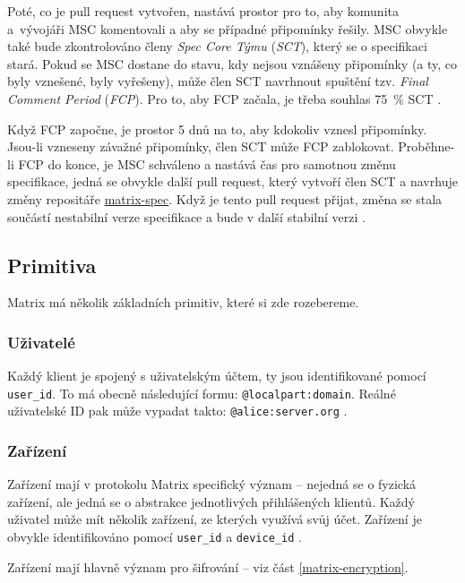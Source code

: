 Poté, co je pull request vytvořen, nastává prostor pro to, aby komunita
a~vývojáři MSC komentovali a aby se případné připomínky řešily. MSC obvykle také
bude zkontrolováno členy \textit{Spec Core Týmu} (\textit{SCT}), který se o
specifikaci stará. Pokud se MSC dostane do stavu, kdy nejsou vznášeny připomínky
(a ty, co byly vznešené, byly vyřešeny), může člen SCT navrhnout spuštění tzv.
\textit{Final Comment Period} (\textit{FCP}). Pro to, aby FCP začala, je třeba
souhlas 75~\% SCT \cite{MatrixORG-MSCs}.

Když FCP započne, je prostor 5 dnů na to, aby kdokoliv vznesl připomínky.
Jsou-li vzneseny závažné připomínky, člen SCT může FCP zablokovat. Proběhne-li
FCP do konce, je MSC schváleno a nastává čas pro samotnou změnu specifikace,
jedná se obvykle další pull request, který vytvoří člen SCT a navrhuje změny
repositáře \href{https://github.com/matrix-org/matrix-spec}{matrix-spec}. Když
je tento pull request přijat, změna se stala součástí nestabilní verze
specifikace a bude v další stabilní verzi \cite{MatrixORG-MSCs}.

\subsection{Primitiva}

Matrix má několik základních primitiv, které si zde rozebereme.

\subsubsection{Uživatelé}

Každý klient je spojený s uživatelským účtem, ty jsou identifikované pomocí
\texttt{user_id}. To má obecně následující formu:
\texttt{@localpart:domain}. Reálné uživatelské ID pak může vypadat
takto: \texttt{@alice:server.org} \cite{MatrixORG-Spec}.

\subsubsection{Zařízení}

Zařízení mají v protokolu Matrix specifický význam -- nejedná se o fyzická
zařízení, ale jedná se o abstrakce jednotlivých přihlášených klientů. Každý
uživatel může mít několik zařízení, ze kterých využívá svůj účet. Zařízení je
obvykle identifikováno pomocí \texttt{user_id} a
\texttt{device_id} \cite{MatrixORG-Spec}.

Zařízení mají hlavně význam pro šifrování -- viz část \ref{matrix-encryption}.

